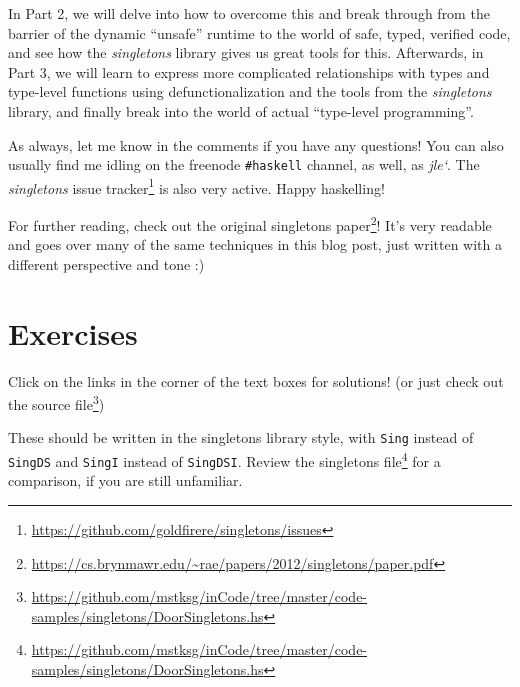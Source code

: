 \documentclass[]{article}
\renewcommand{\href}[2]{#2\footnote{\url{#1}}}
\begin{document}
In Part 2, we will delve into how to overcome this and break through from the
barrier of the dynamic ``unsafe'' runtime to the world of safe, typed, verified
code, and see how the \emph{singletons} library gives us great tools for this.
Afterwards, in Part 3, we will learn to express more complicated relationships
with types and type-level functions using defunctionalization and the tools from
the \emph{singletons} library, and finally break into the world of actual
``type-level programming''.

As always, let me know in the comments if you have any questions! You can also
usually find me idling on the freenode \texttt{\#haskell} channel, as well, as
\emph{jle`}. The \emph{singletons}
\href{https://github.com/goldfirere/singletons/issues}{issue tracker} is also
very active. Happy haskelling!

For further reading, check out the
\href{https://cs.brynmawr.edu/~rae/papers/2012/singletons/paper.pdf}{original
singletons paper}! It's very readable and goes over many of the same techniques
in this blog post, just written with a different perspective and tone :)

\section{Exercises}\label{exercises}

Click on the links in the corner of the text boxes for solutions! (or just check
out
\href{https://github.com/mstksg/inCode/tree/master/code-samples/singletons/DoorSingletons.hs}{the
source file})

These should be written in the singletons library style, with \texttt{Sing}
instead of \texttt{SingDS} and \texttt{SingI} instead of \texttt{SingDSI}.
Review the
\href{https://github.com/mstksg/inCode/tree/master/code-samples/singletons/DoorSingletons.hs}{singletons
file} for a comparison, if you are still unfamiliar.
\end{document}
